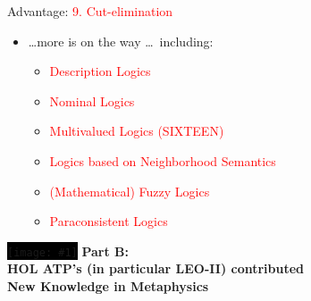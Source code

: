 \documentclass[9pt,mathserif,unknownkeysallowed,xcolor=dvipsnames]{beamer}
\newcommand{\chriscite}[1]{{\small \textcolor{gray}{[#1]}}}
\newenvironment{transitionframe}[2]
{
\begin{frame}{} \Large
\centering
\colorbox{#2}{\texttt{[image: \#1]}}
\vfill
}
{

\end{frame}
}
\begin{document}
\begin{frame}[t]{Advantage: \textcolor{red}{9. Cut-elimination}}
{\begin{itemize}

\item \ldots more is on the way \ldots\ including: 
\begin{itemize}
   \item \textcolor{red}{Description Logics}
   \item \textcolor{red}{Nominal Logics}
   \item \textcolor{red}{Multivalued Logics (SIXTEEN)}
   \item \textcolor{red}{Logics based on Neighborhood Semantics}
   \item \textcolor{red}{(Mathematical) Fuzzy Logics}
   \item \textcolor{red}{Paraconsistent Logics}
\end{itemize}
\end{itemize}
}

\end{frame}





\begin{transitionframe}{./Images/Transitions/ComputerCross}{black}%
  \centering
 \textbf{Part B: \\ HOL ATP's (in particular LEO-II) contributed \\ New Knowledge in Metaphysics}
\end{transitionframe}
\end{document}
